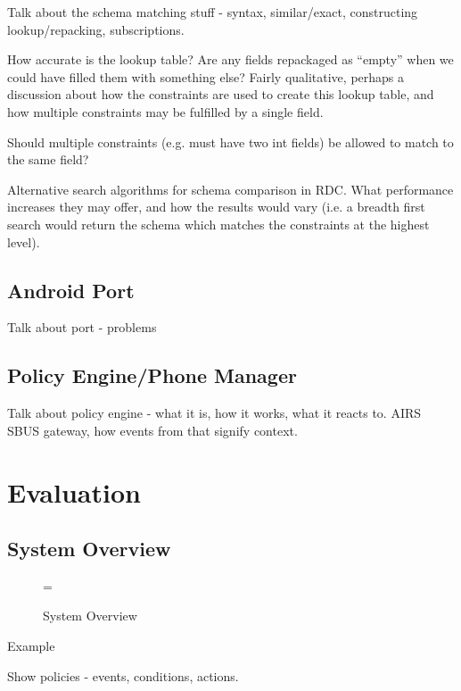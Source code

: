\documentclass[12pt,twoside,notitlepage]{report}
\begin{document}
Talk about the schema matching stuff - syntax, similar/exact, constructing lookup/repacking, subscriptions.

How accurate is the lookup table? 
Are any fields repackaged as ``empty'' when we could have filled them with something else? 
Fairly qualitative, perhaps a discussion about how the constraints are used to create this lookup table, and how multiple constraints may be fulfilled by a single field.

Should multiple constraints (e.g. must have two int fields) be allowed to match to the same field?

Alternative search algorithms for schema comparison in RDC. 
What performance increases they may offer, and how the results would vary (i.e. a breadth first search would return the schema which matches the constraints at the highest level).

\section{Android Port}

Talk about port - problems

\section{Policy Engine/Phone Manager}

Talk about policy engine - what it is, how it works, what it reacts to. AIRS SBUS gateway, how events from that signify context.

\cleardoublepage


\chapter{Evaluation}

\section{System Overview}

\begin{figure}[tbh]
\epsfxsize=\hsize
\centerline{}
\caption{System Overview}
\label{fig:system_overview}
\end{figure}

Example

Show policies - events, conditions, actions.
\end{document}
